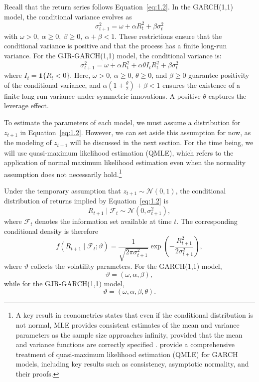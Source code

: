 Recall that the return series follows Equation~\eqref{eq:1.2}. In the GARCH(1,1) model, the conditional variance evolves as
\begin{equation}
    \sigma^2_{t+1} = \omega + \alpha R^2_{t} + \beta\sigma^2_{t}
    \label{eq:2.1}
\end{equation}
with $ \omega > 0,\ \alpha \geq 0,\ \beta \geq 0,\ \alpha + \beta < 1$. These restrictions ensure that the conditional variance is positive and that the process has a finite long-run variance. For the GJR-GARCH(1,1) model, the conditional variance is:
\begin{equation}
    \sigma^2_{t+1} = \omega + \alpha R^2_{t} + \alpha \theta I_{t} R^2_{t} + \beta\sigma^2_{t}
    \label{eq:2.2}
\end{equation}
where $I_t=\mathbf{1}\{R_t<0\}$. Here, $\omega>0$, $\alpha\geq0$, $\theta\geq0$, and $\beta\geq0$ guarantee positivity of the conditional variance, and $\alpha\left(1+\frac{\theta}{2}\right)+\beta<1$ ensures the existence of a finite long-run variance under symmetric innovations. A positive $\theta$ captures the leverage effect.
\newpage

To estimate the parameters of each model, we must assume a distribution for $z_{t+1}$ in Equation~\eqref{eq:1.2}. However, we can set aside this assumption for now, as the modeling of $z_{t+1}$ will be discussed in the next section. For the time being, we will use quasi-maximum likelihood estimation (QMLE), which refers to the application of normal maximum likelihood estimation even when the normality assumption does not necessarily hold.\footnote{A key result in econometrics states that even if the conditional distribution is not normal, MLE provides consistent estimates of the mean and variance parameters as the sample size approaches infinity, provided that the mean and variance functions are correctly specified \cite{Christoffersen2012}.  provide a comprehensive treatment of quasi-maximum likelihood estimation (QMLE) for GARCH models, including key results such as consistency, asymptotic normality, and their proofs.}

Under the temporary assumption that \(z_{t+1}\sim \mathcal{N}(0,1)\), the conditional distribution of returns implied by Equation~\eqref{eq:1.2} is
\[
R_{t+1}\mid \mathcal{F}_t \sim \mathcal{N}(0,\sigma^2_{t+1}),
\]
where \(\mathcal{F}_t\) denotes the information set available at time \(t\). The corresponding conditional density is therefore
\[
f(R_{t+1}\mid \mathcal{F}_t;\vartheta)
=
\frac{1}{\sqrt{2\pi\sigma^2_{t+1}}}
\exp\left(
-\frac{R_{t+1}^2}{2\sigma^2_{t+1}}
\right),
\]
where \(\vartheta\) collects the volatility parameters. For the GARCH(1,1) model,
\[
\vartheta=(\omega,\alpha,\beta),
\]
while for the GJR-GARCH(1,1) model,
\[
\vartheta=(\omega,\alpha,\beta,\theta).
\]

